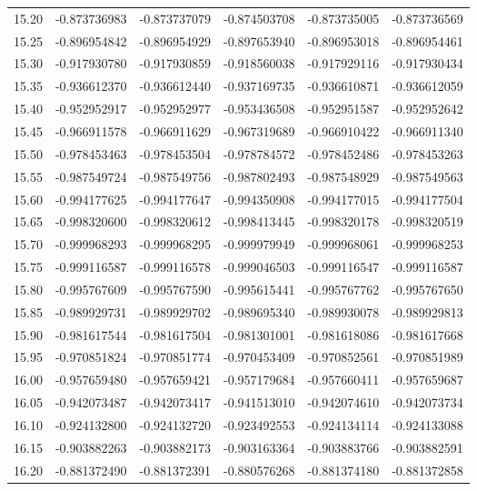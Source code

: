 \documentclass[11pt,a4paper]{article}
\begin{document}
\begin{longtable}{rrrrrr}
15.20 & -0.873736983 & -0.873737079 & -0.874503708 & -0.873735005 & -0.873736569 \\
15.25 & -0.896954842 & -0.896954929 & -0.897653940 & -0.896953018 & -0.896954461 \\
15.30 & -0.917930780 & -0.917930859 & -0.918560038 & -0.917929116 & -0.917930434 \\
15.35 & -0.936612370 & -0.936612440 & -0.937169735 & -0.936610871 & -0.936612059 \\
15.40 & -0.952952917 & -0.952952977 & -0.953436508 & -0.952951587 & -0.952952642 \\
15.45 & -0.966911578 & -0.966911629 & -0.967319689 & -0.966910422 & -0.966911340 \\
15.50 & -0.978453463 & -0.978453504 & -0.978784572 & -0.978452486 & -0.978453263 \\
15.55 & -0.987549724 & -0.987549756 & -0.987802493 & -0.987548929 & -0.987549563 \\
15.60 & -0.994177625 & -0.994177647 & -0.994350908 & -0.994177015 & -0.994177504 \\
15.65 & -0.998320600 & -0.998320612 & -0.998413445 & -0.998320178 & -0.998320519 \\
15.70 & -0.999968293 & -0.999968295 & -0.999979949 & -0.999968061 & -0.999968253 \\
15.75 & -0.999116587 & -0.999116578 & -0.999046503 & -0.999116547 & -0.999116587 \\
15.80 & -0.995767609 & -0.995767590 & -0.995615441 & -0.995767762 & -0.995767650 \\
15.85 & -0.989929731 & -0.989929702 & -0.989695340 & -0.989930078 & -0.989929813 \\
15.90 & -0.981617544 & -0.981617504 & -0.981301001 & -0.981618086 & -0.981617668 \\
15.95 & -0.970851824 & -0.970851774 & -0.970453409 & -0.970852561 & -0.970851989 \\
16.00 & -0.957659480 & -0.957659421 & -0.957179684 & -0.957660411 & -0.957659687 \\
16.05 & -0.942073487 & -0.942073417 & -0.941513010 & -0.942074610 & -0.942073734 \\
16.10 & -0.924132800 & -0.924132720 & -0.923492553 & -0.924134114 & -0.924133088 \\
16.15 & -0.903882263 & -0.903882173 & -0.903163364 & -0.903883766 & -0.903882591 \\
16.20 & -0.881372490 & -0.881372391 & -0.880576268 & -0.881374180 & -0.881372858 \\

\end{longtable}
\end{document}
